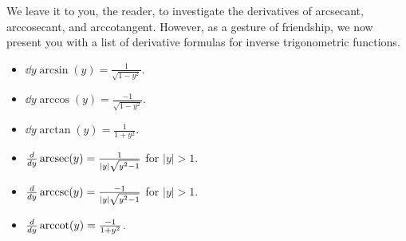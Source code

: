 \documentclass{ximera}
\begin{document}
We leave it to you, the reader, to investigate the derivatives of
arcsecant, arccosecant, and arccotangent. However, as a gesture of
friendship, we now present you with a list of derivative formulas for
inverse trigonometric functions.

\begin{theorem} \hfil
\begin{itemize}
\item $\dd{y} \arcsin(y) = \frac{1}{\sqrt{1-y^2}}$.
\item $\dd{y} \arccos(y) = \frac{-1}{\sqrt{1-y^2}}$.
\item $\dd{y} \arctan(y) = \frac{1}{1+y^2}$.
\item $\frac{d }{d y} \operatorname{arcsec}(y) = \frac{1}{|y|\sqrt{y^2-1}}$ for $|y|>1$.
\item $\frac{d }{d y} \operatorname{arccsc}(y) = \frac{-1}{|y|\sqrt{y^2-1}}$ for $|y|>1$.
\item $\frac{d }{d y} \operatorname{arccot}(y) = \frac{-1}{1+y^2}$.
\end{itemize}
\end{theorem}
\end{document}

